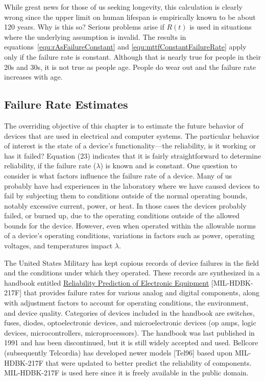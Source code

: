While great news for those of us seeking longevity, this calculation is
clearly wrong since the upper limit on human lifespan is empirically
known to be about 120 years. Why is this so? Serious problems arise if
$R(t)$ is used in situations where the underlying assumption is
invalid. The results in equations~\ref{equ:rAsFailureConstant} and 
\ref{equ:mttfConstantFailureRate} apply only if the failure rate is
constant. Although that is nearly true for people in their 20s and 30s,
it is not true as people age. People do wear out and the failure rate
increases with age.

\subsection{Failure Rate Estimates}
\label{subsection:failure-rate-estimates}

The overriding objective of this chapter is to estimate the future
behavior of devices that are used in electrical and computer systems.
The particular behavior of interest is the state of a device's
functionality---the reliability, is it working or has it failed?
Equation (23) indicates that it is fairly straightforward to determine
reliability, if the failure rate ($\lambda$) is known and is constant.
One question to consider is what factors influence the failure rate of a
device. Many of us probably have had experiences in the laboratory where
we have caused devices to fail by subjecting them to conditions outside
of the normal operating bounds, notably excessive current, power, or
heat. In those cases the devices probably failed, or burned up, due to
the operating conditions outside of the allowed bounds for the device.
However, even when operated within the allowable norms of a device's
operating conditions, variations in factors such as power, operating
voltages, and temperatures impact $\lambda$.

The United States Military has kept copious records of device failures
in the field and the conditions under which they operated. These records
are synthesized in a handbook entitled \ul{Reliability Prediction of
Electronic Equipment} {[}MIL-HDBK-217F{]} that provides failure rates
for various analog and digital components, along with adjustment factors
to account for operating conditions, the environment, and device
quality. Categories of devices included in the handbook are switches,
fuses, diodes, optoelectronic devices, and microelectronic devices (op
amps, logic devices, microcontrollers, microprocessors). The handbook
was last published in 1991 and has been discontinued, but it is still
widely accepted and used. Bellcore (subsequently Telcordia) has
developed newer models {[}Tel96{]} based upon MIL-HDBK-217F that were
updated to better predict the reliability of components. MIL-HDBK-217F
is used here since it is freely available in the public domain.

